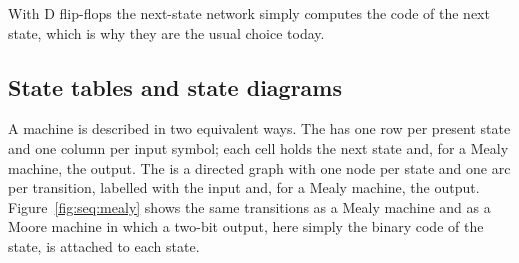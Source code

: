 With D flip-flops the next-state network simply computes the code of the next
state, which is why they are the usual choice today.

\subsection{State tables and state diagrams}

A machine is described in two equivalent ways. The  has one
row per present state and one column per input symbol; each cell holds the
next state and, for a Mealy machine, the output. The  is
a directed graph with one node per state and one arc per transition, labelled
with the input and, for a Mealy machine, the output.
Figure~\ref{fig:seq:mealy} shows the same transitions as a Mealy machine and
as a Moore machine in which a two-bit output, here simply the binary code of
the state, is attached to each state.

